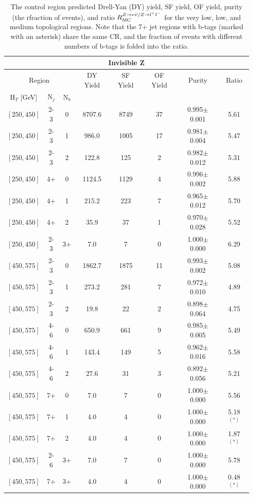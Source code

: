 \begin{table}
	\centering
	\renewcommand{\baselinestretch}{1.0}
	\caption{The control region predicted Drell-Yan (DY) yield, SF yield, OF yield, purity (the rfraction of \zll events), and ratio $R_{\mathrm{MC}}^{Z\rightarrow\nu\bar{\nu} / Z\rightarrow l^+ l^-}$ for the very low, low, and medium \HT topological regions. Note that the 7+ jet regions with b-tags (marked with an asterisk) share the same CR, and the fraction of events with different numbers of b-tags is folded into the ratio.}
	\small
	\renewcommand{\arraystretch}{1.0}
	\begin{tabular}{c|c|c|c|c|c|c|c}
\hline \hline
\multicolumn{8}{c}{Invisible Z} \\
\hline
\multicolumn{3}{c|}{Region} & DY Yield & SF Yield & OF Yield & Purity & Ratio\\
$\text{H}_{T}$ [GeV] & $\text{N}_{j}$ & $\text{N}_{b}$ & & & &  \\
\hline
$[250,450]$ &2-3&0&8707.6&8749&37&0.995$\pm$0.001&5.61\\
$[250,450]$ &2-3&1&986.0&1005&17&0.981$\pm$0.004&5.47\\
$[250,450]$ &2-3&2&122.8&125&2&0.982$\pm$0.012&5.31\\
$[250,450]$ &4+&0&1124.5&1129&4&0.996$\pm$0.002&5.88\\
$[250,450]$ &4+&1&215.2&223&7&0.965$\pm$0.012&5.70\\
$[250,450]$ &4+&2&35.9&37&1&0.970$\pm$0.028&5.52\\
$[250,450]$ &2-3&3+&7.0&7&0&1.000$\pm$0.000&6.29\\
$[450,575]$ &2-3&0&1862.7&1875&11&0.993$\pm$0.002&5.08\\
$[450,575]$ &2-3&1&273.2&281&7&0.972$\pm$0.010&4.89\\
$[450,575]$ &2-3&2&19.8&22&2&0.898$\pm$0.064&4.75\\
$[450,575]$ &4-6&0&650.9&661&9&0.985$\pm$0.005&5.49\\
$[450,575]$ &4-6&1&143.4&149&5&0.962$\pm$0.016&5.58\\
$[450,575]$ &4-6&2&27.6&31&3&0.892$\pm$0.056&5.21\\
$[450,575]$ &7+&0&7.0&7&0&1.000$\pm$0.000&5.56\\
$[450,575]$ &7+&1&4.0&4&0&1.000$\pm$0.000&5.18$^{(*)}$\\
$[450,575]$ &7+&2&4.0&4&0&1.000$\pm$0.000&1.87$^{(*)}$\\
$[450,575]$ &2-6&3+&7.0&7&0&1.000$\pm$0.000&5.78\\
$[450,575]$ &7+&3+&4.0&4&0&1.000$\pm$0.000&0.48$^{(*)}$\\

\end{tabular}
\end{table}
